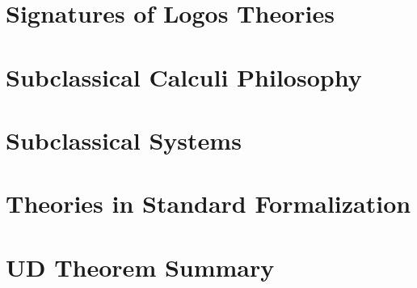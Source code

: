 \documentclass{report}
\begin{document}
\chapter{Signatures of Logos Theories}
%

\chapter{Subclassical Calculi Philosophy}
%

\chapter{Subclassical Systems}
%

\chapter{Theories in Standard Formalization}
%

\chapter{UD Theorem Summary}
%
\end{document}
